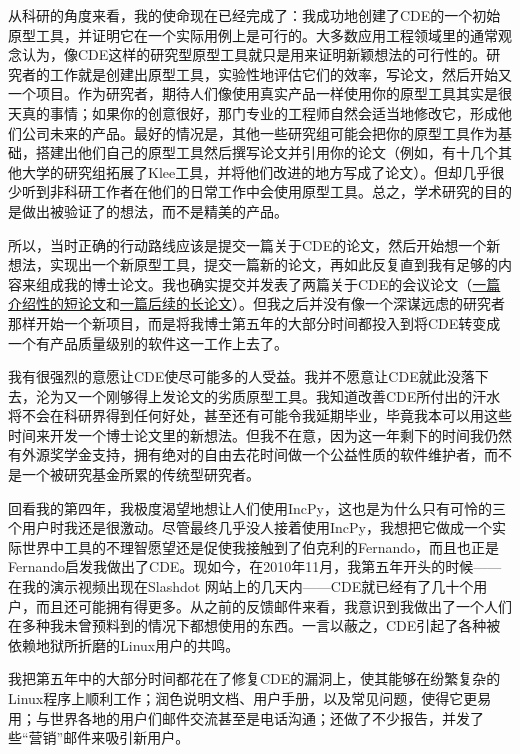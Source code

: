 \documentclass[12pt,UTF8,nofonts]{book}
\begin{document}
\breakline

从科研的角度来看，我的使命现在已经完成了：我成功地创建了CDE的一个初始原型工具，并证明它在一个实际用例上是可行的。大多数应用工程领域里的通常观念认为，像CDE这样的研究型原型工具就只是用来证明新颖想法的可行性的。研究者的工作就是创建出原型工具，实验性地评估它们的效率，写论文，然后开始又一个项目。作为研究者，期待人们像使用真实产品一样使用你的原型工具其实是很天真的事情；如果你的创意很好，那门专业的工程师自然会适当地修改它，形成他们公司未来的产品。最好的情况是，其他一些研究组可能会把你的原型工具作为基础，搭建出他们自己的原型工具然后撰写论文并引用你的论文（例如，有十几个其他大学的研究组拓展了Klee工具，并将他们改进的地方写成了论文）。但却几乎很少听到非科研工作者在他们的日常工作中会使用原型工具。总之，学术研究的目的是做出被验证了的想法，而不是精美的产品。

所以，当时正确的行动路线应该是提交一篇关于CDE的论文，然后开始想一个新想法，实现出一个新原型工具，提交一篇新的论文，再如此反复直到我有足够的内容来组成我的博士论文。我也确实提交并发表了两篇关于CDE的会议论文（\href{http://www.pgbovine.net/projects/pubs/guo_usenix11_camera_ready.pdf}{一篇介绍性的短论文}和\href{http://www.pgbovine.net/projects/pubs/cde_LISA.pdf}{一篇后续的长论文}）。但我之后并没有像一个深谋远虑的研究者那样开始一个新项目，而是将我博士第五年的大部分时间都投入到将CDE转变成一个有产品质量级别的软件这一工作上去了。

我有很强烈的意愿让CDE使尽可能多的人受益。我并不愿意让CDE就此没落下去，沦为又一个刚够得上发论文的劣质原型工具。我知道改善CDE所付出的汗水将不会在科研界得到任何好处，甚至还有可能令我延期毕业，毕竟我本可以用这些时间来开发一个博士论文里的新想法。但我不在意，因为这一年剩下的时间我仍然有外源奖学金支持，拥有绝对的自由去花时间做一个公益性质的软件维护者，而不是一个被研究基金所累的传统型研究者。

回看我的第四年，我极度渴望地想让人们使用IncPy，这也是为什么只有可怜的三个用户时我还是很激动。尽管最终几乎没人接着使用IncPy，我想把它做成一个实际世界中工具的不理智愿望还是促使我接触到了伯克利的Fernando，而且也正是Fernando启发我做出了CDE。现如今，在2010年11月，我第五年开头的时候——在我的演示视频出现在Slashdot 网站上的几天内——CDE就已经有了几十个用户，而且还可能拥有得更多。从之前的反馈邮件来看，我意识到我做出了一个人们在多种我未曾预料到的情况下都想使用的东西。一言以蔽之，CDE引起了各种被依赖地狱所折磨的Linux用户的共鸣。

\breakline

我把第五年中的大部分时间都花在了修复CDE的漏洞上，使其能够在纷繁复杂的Linux程序上顺利工作；润色说明文档、用户手册，以及常见问题，使得它更易用；与世界各地的用户们邮件交流甚至是电话沟通；还做了不少报告，并发了些“营销”邮件来吸引新用户。
\end{document}

